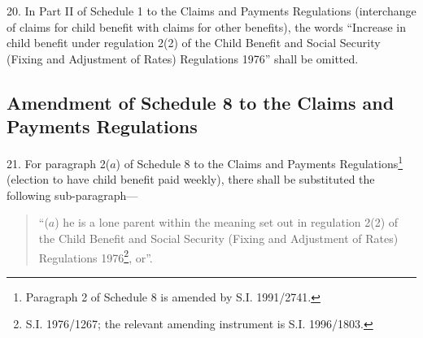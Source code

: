 \documentclass[12pt,a4paper]{article}
\begin{document}
20.  In Part II of Schedule 1 to the Claims and Payments Regulations (interchange of claims for child benefit with claims for other benefits), the words “Increase in child benefit under regulation 2(2) of the Child Benefit and Social Security (Fixing and Adjustment of Rates) Regulations 1976” shall be omitted.

\subsection[21. Amendment of Schedule 8 to the Claims and Payments Regulations]{Amendment of Schedule 8 to the Claims and Payments Regulations}

21.  For paragraph 2($a$) of Schedule 8 to the Claims and Payments Regulations\footnote{\frenchspacing Paragraph 2 of Schedule 8 is amended by S.I. 1991/2741.} (election to have child benefit paid weekly), there shall be substituted the following sub-paragraph—
\begin{quotation}
“($a$) he is a lone parent within the meaning set out in regulation 2(2) of the Child Benefit and Social Security (Fixing and Adjustment of Rates) Regulations 1976\footnote{\frenchspacing S.I. 1976/1267; the relevant amending instrument is S.I. 1996/1803.}, or”.
\end{quotation}

\end{document}
